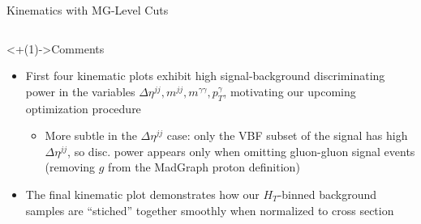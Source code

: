 \documentclass[]{beamer}
\begin{document}
\begin{frame}[label=current]{Kinematics with MG-Level Cuts}
    \begin{columns}
    \end{columns}
    \begin{columns}
        \begin{column}{0.1\linewidth}
        \end{column}
        \begin{column}{0.1\linewidth}
        \end{column}
    \end{columns}
    \begin{block}<+(1)->{Comments}
        \begin{itemize}[<+(1)->]
            \item First four kinematic plots exhibit high signal-background discriminating power in the variables $\Delta \eta^{jj}, m^{jj}, m^{\gamma \gamma}, p_T^{\gamma}$, motivating our upcoming optimization procedure
            \begin{itemize}[<+(1)->]
                \item More subtle in the $\Delta \eta^{jj}$ case: only the VBF subset of the signal has high $\Delta \eta^{jj}$, so disc. power appears only when omitting gluon-gluon signal events (removing $g$ from the MadGraph proton definition)
            \end{itemize}
            \item The final kinematic plot demonstrates how our $H_T$-binned background samples are ``stiched'' together smoothly when normalized to cross section
        \end{itemize}
    \end{block}
\end{frame}
\end{document}
